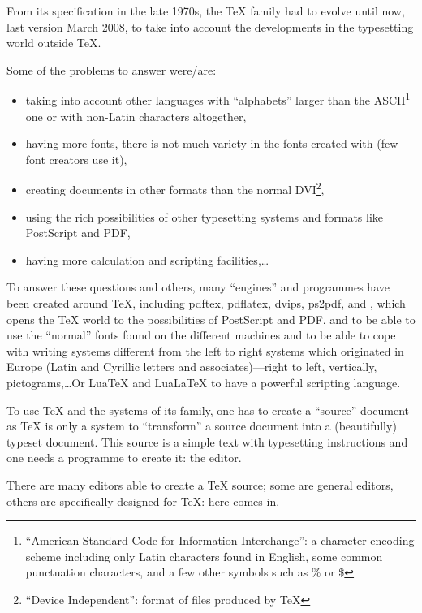 From its specification in the late 1970s, the {\TeX} family had to evolve until now, last version March 2008, to take into account the developments in the typesetting world outside {\TeX}.

Some of the problems to answer were/are:
\begin{itemize}
	\item taking into account other languages with ``alphabets'' larger than the ASCII\footnote{``American Standard Code for Information Interchange'': a character encoding scheme including only Latin characters found in English, some common punctuation characters, and a few other symbols such as \% or \$} one or with non-Latin characters altogether,
	\item having more fonts, there is not much variety in the fonts created with {\METAFONT} (few font creators use it),
	\item creating documents in other formats than the normal DVI\footnote{``Device Independent'': format of files produced by {\TeX}},
	\item using the rich possibilities of other typesetting systems and formats like PostScript and PDF,
	\item having more calculation and scripting facilities,\dots
\end{itemize}

To answer these questions and others, many ``engines'' and programmes have been created around {\TeX}, including pdftex, pdflatex, dvips, ps2pdf, and {\METAPOST}, which opens the {\TeX} world to the possibilities of PostScript and PDF. \XeTeX{} and \XeLaTeX to be able to use the ``normal'' fonts found on the different machines and to be able to cope with writing systems different from the left to right systems which originated in Europe (Latin and Cyrillic letters and associates)---right to left, vertically, pictograms,\dots Or LuaTeX and LuaLaTeX to have a powerful scripting language.

To use {\TeX} and the systems of its family, one has to create a ``source'' document as {\TeX} is only a system to ``transform'' a source document into a (beautifully) typeset document. This source is a simple text with typesetting instructions and one needs a programme to create it: the editor.

There are many editors able to create a {\TeX} source; some are general editors, others are specifically designed for {\TeX}: here \Tw{} comes in.
\bigskip

